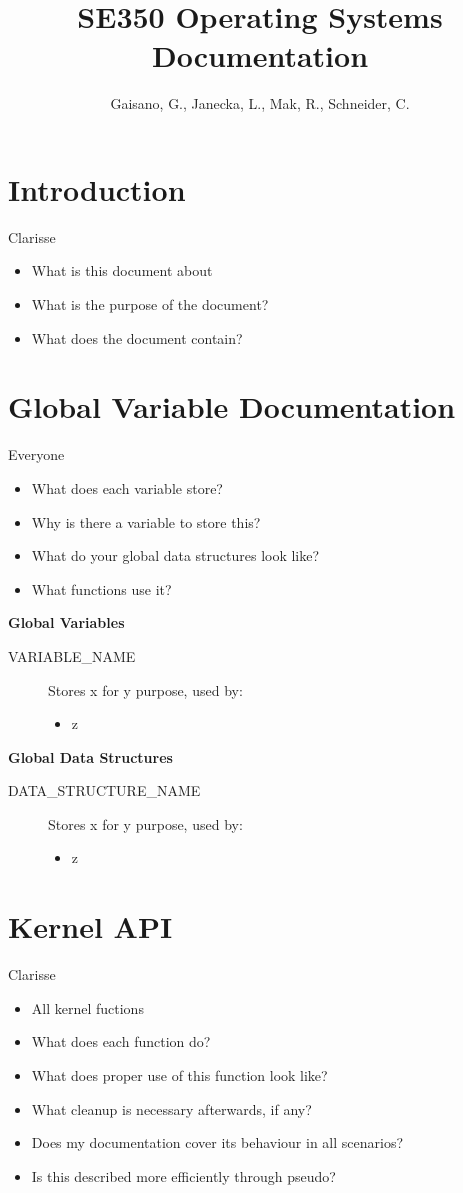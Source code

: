 \documentclass[11pt, oneside]{article}
\title{SE350 Operating Systems Documentation}
\author{Gaisano, G., Janecka, L., Mak, R., Schneider, C.}
\begin{document}
\maketitle

\section{Introduction}
Clarisse
\begin{itemize}
\item What is this document about
\item What is the purpose of the document?
\item What does the document contain?
\end{itemize}

\section{Global Variable Documentation}
Everyone
\begin{itemize}
\item What does each variable store?
\item Why is there a variable to store this?
\item What do your global data structures look like?
\item What functions use it?
\end{itemize}

{\bf Global Variables}
\begin{description}
\item [VARIABLE\_NAME] Stores x for y purpose, used by:
\begin{itemize}
\item z
\end{itemize}
\end{description}

{\bf Global Data Structures}
\begin{description}
\item [DATA\_STRUCTURE\_NAME] Stores x for y purpose, used by:
\begin{itemize}
\item z
\end{itemize}
\end{description}

\section{Kernel API}
Clarisse
\begin{itemize}
\item All kernel fuctions
\item What does each function do?
\item What does proper use of this function look like?
\item What cleanup is necessary afterwards, if any?
\item Does my documentation cover its behaviour in all scenarios?
\item Is this described more efficiently through pseudo?
\end{itemize}
\end{document}
